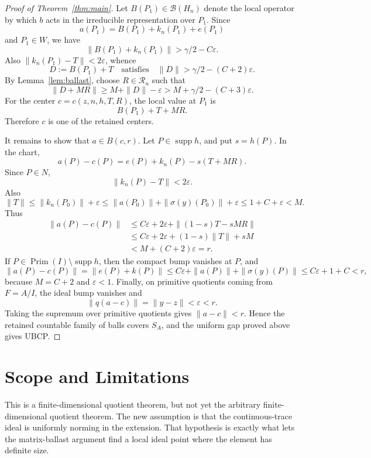 \documentclass[11pt]{article}
\newcommand{\Prim}{\operatorname{Prim}}
\newcommand{\supp}{\operatorname{supp}}
\begin{document}
\begin{proof}[Proof of Theorem~\ref{thm:main}]
Let \(B(P_1)\in\mathcal B(H_n)\) denote the local operator by which \(b\) acts
in the irreducible representation over \(P_1\).  Since
\[
        a(P_1)=B(P_1)+k_n(P_1)+e(P_1)
\]
and \(P_1\in W\), we have
\[
        \|B(P_1)+k_n(P_1)\|>\gamma/2-C\varepsilon.
\]
Also \(\|k_n(P_1)-T\|<2\varepsilon\), whence
\[
        D:=B(P_1)+T
        \quad\text{satisfies}\quad
        \|D\|>\gamma/2-(C+2)\varepsilon.
\]
By Lemma~\ref{lem:ballast}, choose \(R\in\mathcal R_n\) such that
\[
        \|D+MR\|\ge M+\|D\|-\varepsilon
        >
        M+\gamma/2-(C+3)\varepsilon.
\]
For the center \(c=c(z,n,h,T,R)\), the local value at \(P_1\) is
\[
        B(P_1)+T+MR.
\]
Therefore \(c\) is one of the retained centers.

It remains to show that \(a\in B(c,r)\).  Let \(P\in\supp h\), and put
\(s=h(P)\).  In the chart,
\[
        a(P)-c(P)
        =
        e(P)+k_n(P)-s(T+MR).
\]
Since \(P\in N\),
\[
        \|k_n(P)-T\|<2\varepsilon.
\]
Also
\[
        \|T\|\le \|k_n(P_0)\|+\varepsilon
        \le \|a(P_0)\|+\|\sigma(y)(P_0)\|+\varepsilon
        \le 1+C+\varepsilon<M.
\]
Thus
\[
 \begin{aligned}
        \|a(P)-c(P)\|
        &\le C\varepsilon+2\varepsilon
             +\|(1-s)T-sMR\| \\
        &\le C\varepsilon+2\varepsilon
             +(1-s)\|T\|+sM \\
        &< M+(C+2)\varepsilon
        =r .
 \end{aligned}
\]
If \(P\in\Prim(I)\setminus\supp h\), then the compact bump vanishes at \(P\),
and
\[
        \|a(P)-c(P)\|=\|e(P)+k(P)\|
        \le C\varepsilon+\|a(P)\|+\|\sigma(y)(P)\|
        \le C\varepsilon+1+C<r,
\]
because \(M=C+2\) and \(\varepsilon<1\).  Finally, on primitive quotients
coming from \(F=A/I\), the ideal bump vanishes and
\[
        \|q(a-c)\|=\|y-z\|<\varepsilon<r.
\]
Taking the supremum over primitive quotients gives \(\|a-c\|<r\).  Hence the
retained countable family of balls covers \(S_A\), and the uniform gap proved
above gives UBCP.
\end{proof}

\section*{Scope and Limitations}

This is a finite-dimensional quotient theorem, but not yet the arbitrary
finite-dimensional quotient theorem.  The new assumption is that the
continuous-trace ideal is uniformly norming in the extension.  That hypothesis
is exactly what lets the matrix-ballast argument find a local ideal point
where the element has definite size.
\end{document}
